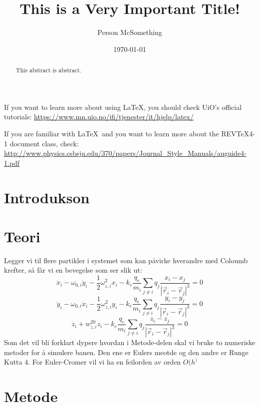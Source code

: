 \documentclass[reprint,english,notitlepage]{revtex4-1}  %
\begin{document}
\title{This is a Very Important Title!}   %
\author{Person McSomething}               %
\date{\today}                             %
\noaffiliation                            %
\begin{abstract}                          %
This abstract is abstract.                %
\end{abstract}                            %
\maketitle                                %

If you want to learn more about using \LaTeX, you should check UiO's official tutorials:
\url{https://www.mn.uio.no/ifi/tjenester/it/hjelp/latex/}

If you are familiar with \LaTeX\ and you want to learn more about the REVTeX4-1 document class, check:
\url{http://www.physics.csbsju.edu/370/papers/Journal_Style_Manuals/auguide4-1.pdf}


\section{Introdukson}

\section{Teori}   %
Legger vi til flere partikler i systemet som kan påvirke hverandre med Coloumb krefter, så får vi en bevegelse som ser slik ut:
$$
\ddot{x}_i -\omega_{0,i} \ddot{y}_i-\frac{1}{2}\omega_{z,i}^2x_i-k_e\frac{q_e}{m_i}\sum_{j\neq i}q_j\frac{x_i-x_j}{|\vec{r}_i-\vec{r}_j|^3}=0
$$
$$
\ddot{y}_i -\omega_{0,i} \ddot{x}_i-\frac{1}{2}\omega_{z,i}^2y_i-k_e\frac{q_e}{m_i}\sum_{j\neq i}q_j\frac{y_i-y_j}{|\vec{r}_i-\vec{r}_j|^3}=0
$$
$$
\ddot{z}_i+w_{z,i}^20z_i-k_e\frac{q_e}{m_i}\sum_{j\neq i}q_j\frac{z_i-z_j}{|\vec{r}_i-\vec{r}_j|^3}=0
$$
Som det vil bli forklart dypere hvordan i Metode-delen skal vi bruke to numeriske metoder for å simulere banen. Den ene er Eulers meotde og den andre er Runge Kutta 4. For Euler-Cromer vil vi ha en feilorden av orden $O(h^)$
\section{Metode}
\end{document}
